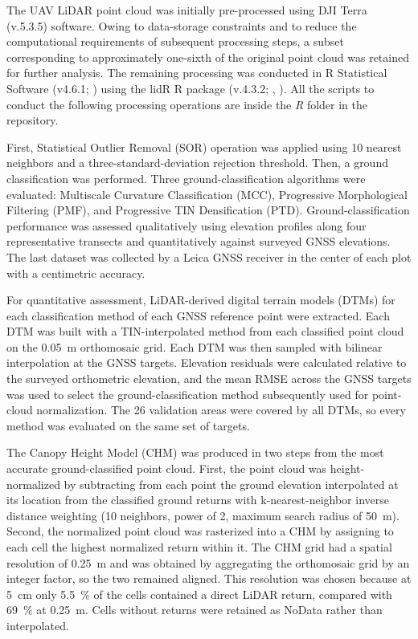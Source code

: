 \documentclass[12pt,a4paper]{article}
\begin{document}
The UAV LiDAR point cloud was initially pre-processed using DJI Terra (v.5.3.5) software. Owing to data-storage constraints and to reduce the computational requirements of subsequent processing steps, a subset corresponding to approximately one-sixth of the original point cloud was retained for further analysis. The remaining processing was conducted in R Statistical Software (v4.6.1; \citealp{rsoftware}) using the lidR R package (v.4.3.2; \citealp{lidr2020}, \citealp{lidr2026}). All the scripts to conduct the following processing operations are inside the \textit{R} folder in the repository.

First, Statistical Outlier Removal (SOR) operation was applied using 10 nearest neighbors and a three-standard-deviation rejection threshold. Then, a ground classification was performed. Three ground-classification algorithms were evaluated: Multiscale Curvature Classification (MCC), Progressive Morphological Filtering (PMF), and Progressive TIN Densification (PTD). Ground-classification performance was assessed qualitatively using elevation profiles along four representative transects and quantitatively against surveyed GNSS elevations. The last dataset was collected by a Leica GNSS receiver in the center of each plot with a centimetric accuracy.

For quantitative assessment, LiDAR-derived digital terrain models (DTMs) for each classification method of each GNSS reference point were extracted. Each DTM was built with a TIN-interpolated method from each classified point cloud on the \qty{0.05}{\metre} orthomosaic grid. Each DTM was then sampled with bilinear interpolation at the GNSS targets. Elevation residuals were calculated relative to the surveyed orthometric elevation, and the mean RMSE across the GNSS targets was used to select the ground-classification method subsequently used for point-cloud normalization. The 26 validation areas were covered by all DTMs, so every method was evaluated on the same set of targets.

The Canopy Height Model (CHM) was produced in two steps from the most accurate ground-classified point cloud. First, the point cloud was height-normalized by subtracting from each point the ground elevation interpolated at its location from the classified ground returns with k-nearest-neighbor inverse distance weighting (10 neighbors, power of 2, maximum search radius of \qty{50}{\metre}). Second, the normalized point cloud was rasterized into a CHM by assigning to each cell the highest normalized return within it. The CHM grid had a spatial resolution of \qty{0.25}{\metre} and was obtained by aggregating the orthomosaic grid by an integer factor, so the two remained aligned. This resolution was chosen because at \qty{5}{\centi\metre} only \qty{5.5}{\percent} of the cells contained a direct LiDAR return, compared with \qty{69}{\percent} at \qty{0.25}{\metre}. Cells without returns were retained as NoData rather than interpolated.
\end{document}
